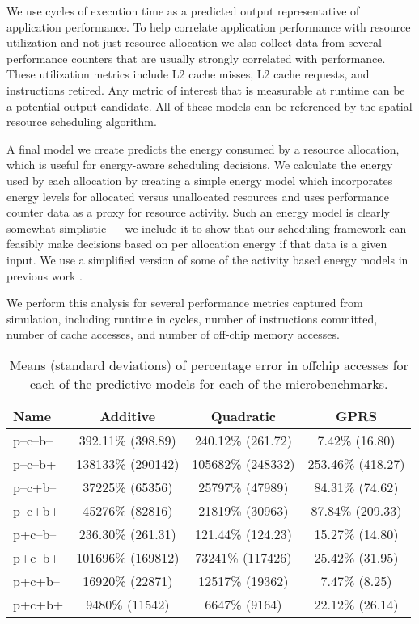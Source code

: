 
We use cycles of execution time as a predicted output representative of application performance.  To help correlate application performance with resource utilization and not just resource allocation we also collect data from several performance counters that are usually strongly correlated with performance. These utilization metrics include L2 cache misses, L2 cache requests, and instructions retired. Any metric of interest that is measurable at runtime can be a potential output candidate. All of these models can be referenced by the spatial resource scheduling algorithm.


A final model we create predicts the energy consumed by a resource allocation, which is useful  for energy-aware scheduling decisions. We calculate the energy used by each allocation by creating a simple energy model which incorporates energy levels for allocated versus unallocated resources and uses performance counter data as a proxy for resource activity.  Such an energy model is clearly somewhat simplistic --- we include it to show that our scheduling framework can feasibly make decisions based on per allocation energy if that data is a given input.  We use a simplified version of some of the activity based energy models in previous work \cite{}.

We perform this analysis for several performance metrics captured from simulation, including runtime in cycles, number of instructions committed, number of cache accesses, and number of off-chip memory accesses.

\begin{table}
\scriptsize
\begin{tabular}{|l|c|c|c|}
\hline
Name & Additive & Quadratic & GPRS \\ \hline
  p--c--b-- & 392.11\% (398.89) &  240.12\% (261.72) & 7.42\% (16.80)  \\ \hline
 p--c--b+ &  138133\% (290142)&  105682\% (248332) &  253.46\% (418.27)  \\ \hline
 p--c+b-- &   37225\% (65356) &  25797\% (47989) & 84.31\% (74.62)  \\ \hline
 p--c+b+ &   45276\% (82816) &  21819\% (30963) &  87.84\% (209.33)  \\ \hline
 p+c--b-- & 236.30\% (261.31) &  121.44\% (124.23) & 15.27\% (14.80)    \\ \hline
 p+c--b+ &   101696\% (169812)  &  73241\% (117426) & 25.42\% (31.95) \\ \hline
 p+c+b--&  16920\% (22871)&   12517\% (19362) & 7.47\% (8.25)  \\ \hline
 p+c+b+&   9480\% (11542) &  6647\% (9164) &  22.12\% (26.14)  \\ \hline
  \end{tabular}
 \caption{Means (standard deviations) of percentage error in offchip accesses for each of the predictive models for each of the microbenchmarks.}
\label{table:acc-offchip}
\end{table}


